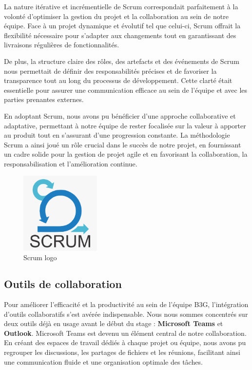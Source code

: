 La nature itérative et incrémentielle de Scrum correspondait parfaitement à la volonté d'optimiser la gestion du projet et la collaboration au sein de notre équipe. Face à un projet dynamique et évolutif tel que celui-ci, Scrum offrait la flexibilité nécessaire pour s'adapter aux changements tout en garantissant des livraisons régulières de fonctionnalités.

De plus, la structure claire des rôles, des artefacts et des événements de Scrum nous permettait de définir des responsabilités précises et de favoriser la transparence tout au long du processus de développement. Cette clarté était essentielle pour assurer une communication efficace au sein de l'équipe et avec les parties prenantes externes.

En adoptant Scrum, nous avons pu bénéficier d'une approche collaborative et adaptative, permettant à notre équipe de rester focalisée sur la valeur à apporter au produit tout en s'assurant d'une progression constante. La méthodologie Scrum a ainsi joué un rôle crucial dans le succès de notre projet, en fournissant un cadre solide pour la gestion de projet agile et en favorisant la collaboration, la responsabilisation et l'amélioration continue.


\begin{figure}[H]
    \centering
    \includegraphics[width=4cm]{Figures/scrum.png}
    \caption{Scrum logo}
\end{figure}








\subsection{Outils de collaboration}

\hspace{\parindent}Pour améliorer l'efficacité et la productivité au sein de l'équipe B3G, l'intégration d'outils collaboratifs s'est avérée indispensable. Nous nous sommes concentrés sur deux outils déjà en usage avant le début du stage : \textbf{Microsoft Teams} et \textbf{Outlook}. Microsoft Teams est devenu un élément central de notre collaboration. En créant des espaces de travail dédiés à chaque projet ou équipe, nous avons pu regrouper les discussions, les partages de fichiers et les réunions, facilitant ainsi une communication fluide et une organisation optimale des tâches.

